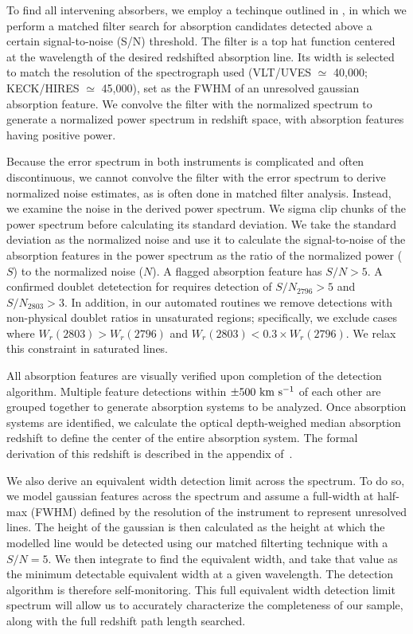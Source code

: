 \documentclass[iop,apj,numberedappendix,appendixfloats,twocolappendix]{emulateapj}
\begin{document}
To find all intervening {\MgIIdblt} absorbers, we employ a techinque outlined in \cite{Zhu2013}, in which we perform a matched filter search for absorption candidates detected above a certain signal-to-noise (S/N) threshold. The filter is a top hat function centered at the wavelength of the desired redshifted absorption line. Its width is selected to match the resolution of the spectrograph used (VLT/UVES $\simeq$ 40,000; KECK/HIRES $\simeq$ 45,000), set as the FWHM of an unresolved gaussian absorption feature. We convolve the filter with the normalized spectrum to generate a normalized power spectrum in redshift space, with absorption features having positive power. 

Because the error spectrum in both instruments is complicated and often discontinuous, we cannot convolve the filter with the error spectrum to derive normalized noise estimates, as is often done in matched filter analysis. Instead, we examine the noise in the derived power spectrum. We sigma clip chunks of the power spectrum before calculating its standard deviation. We take the standard deviation as the normalized noise and use it to calculate the signal-to-noise of the absorption features in the power spectrum as the ratio of the normalized power ($S$) to the normalized noise ($N$). A flagged absorption feature has $S/N > 5$. A confirmed doublet detetection for {\MgIIdblt} requires detection of $S/N_{2796} > 5$ and $S/N_{2803} > 3$. In addition, in our automated routines we remove detections with non-physical doublet ratios in unsaturated regions; specifically, we exclude cases where $W_r(2803) > W_r(2796)$ and $W_r(2803) < 0.3 \times W_r(2796)$. We relax this constraint in saturated lines. 

All absorption features are visually verified upon completion of the detection algorithm. Multiple feature detections within $\pm 500~\mathrm{\hbox{km~s$^{-1}$}}$ of each other are grouped together to generate absorption systems to be analyzed. Once absorption systems are identified, we calculate the optical depth-weighed median absorption redshift to define the center of the entire absorption system. The formal derivation of this redshift is described in the appendix of~\cite{Churchill2001}.

We also derive an equivalent width detection limit across the spectrum. To do so, we model gaussian features across the spectrum and assume a full-width at half-max (FWHM) defined by the resolution of the instrument to represent unresolved lines. The height of the gaussian is then calculated as the height at which the modelled line would be detected using our matched filterting technique with a $S/N = 5$. We then integrate to find the equivalent width, and take that value as the minimum detectable equivalent width at a given wavelength. The detection algorithm is therefore self-monitoring. This full equivalent width detection limit spectrum will allow us to accurately characterize the completeness of our sample, along with the full redshift path length searched. 
\end{document}
